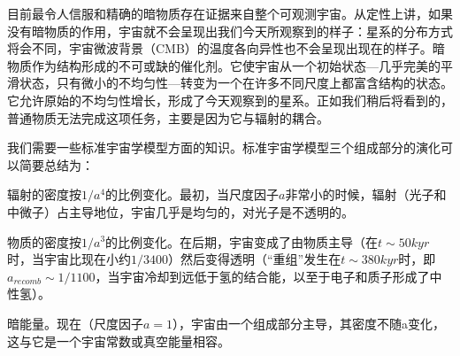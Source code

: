 

目前最令人信服和精确的暗物质存在证据来自整个可观测宇宙。从定性上讲，如果没有暗物质的作用，宇宙就不会呈现出我们今天所观察到的样子：星系的分布方式将会不同，宇宙微波背景（CMB）的温度各向异性也不会呈现出现在的样子。暗物质作为结构形成的不可或缺的催化剂。它使宇宙从一个初始状态—几乎完美的平滑状态，只有微小的不均匀性—转变为一个在许多不同尺度上都富含结构的状态。它允许原始的不均匀性增长，形成了今天观察到的星系。正如我们稍后将看到的，普通物质无法完成这项任务，主要是因为它与辐射的耦合。

我们需要一些标准宇宙学模型方面的知识。标准宇宙学模型三个组成部分的演化可以简要总结为：

辐射的密度按$1/a^4$的比例变化。最初，当尺度因子$a$非常小的时候，辐射（光子和中微子）占主导地位，宇宙几乎是均匀的，对光子是不透明的。

物质的密度按$1/a^3$的比例变化。在后期，宇宙变成了由物质主导（在$t \sim 50 kyr$时，当宇宙比现在小约$1/3400$）然后变得透明（“重组”发生在$t \sim 380 kyr$时，即$a_{recomb} \sim 1/1100$，当宇宙冷却到远低于氢的结合能，以至于电子和质子形成了中性氢）。

暗能量。现在（尺度因子$a = 1$），宇宙由一个组成部分主导，其密度不随a变化，这与它是一个宇宙常数或真空能量相容。
